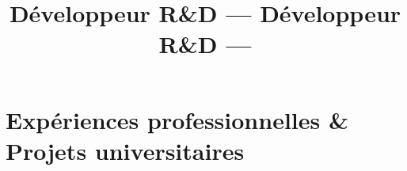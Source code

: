 \documentclass[11pt,a4paper]{moderncv}
\title{Développeur R\&D  \newline --- \newline \newline Développeur R\&D \newline ---}
\begin{document}
\maketitle


\section{Expériences professionnelles \& Projets universitaires}
\end{document}
